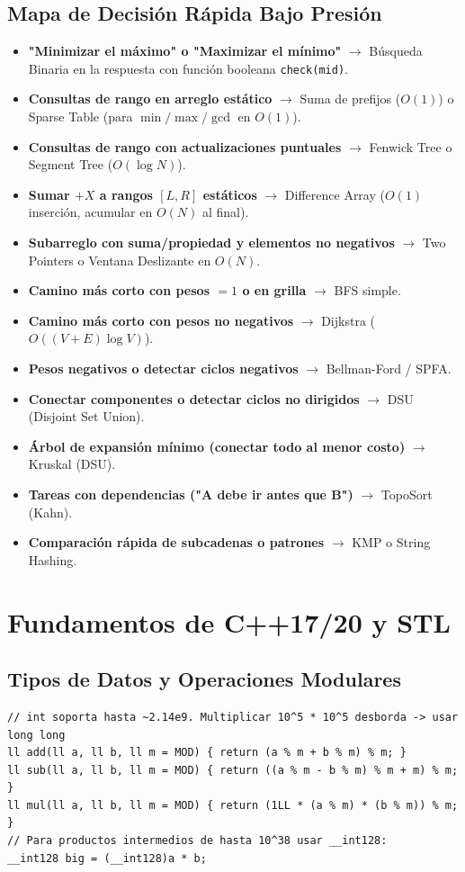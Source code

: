 \documentclass[9pt,twocolumn,a4paper]{extarticle}
\begin{document}
\subsection{Mapa de Decisión Rápida Bajo Presión}
\begin{itemize}
    \setlength{\itemsep}{0pt}
    \item \textbf{"Minimizar el máximo" o "Maximizar el mínimo"} $\to$ Búsqueda Binaria en la respuesta con función booleana \texttt{check(mid)}.
    \item \textbf{Consultas de rango en arreglo estático} $\to$ Suma de prefijos ($O(1)$) o Sparse Table (para $\min/\max/\gcd$ en $O(1)$).
    \item \textbf{Consultas de rango con actualizaciones puntuales} $\to$ Fenwick Tree o Segment Tree ($O(\log N)$).
    \item \textbf{Sumar $+X$ a rangos $[L, R]$ estáticos} $\to$ Difference Array ($O(1)$ inserción, acumular en $O(N)$ al final).
    \item \textbf{Subarreglo con suma/propiedad y elementos no negativos} $\to$ Two Pointers o Ventana Deslizante en $O(N)$.
    \item \textbf{Camino más corto con pesos $=1$ o en grilla} $\to$ BFS simple.
    \item \textbf{Camino más corto con pesos no negativos} $\to$ Dijkstra ($O((V+E)\log V)$).
    \item \textbf{Pesos negativos o detectar ciclos negativos} $\to$ Bellman-Ford / SPFA.
    \item \textbf{Conectar componentes o detectar ciclos no dirigidos} $\to$ DSU (Disjoint Set Union).
    \item \textbf{Árbol de expansión mínimo (conectar todo al menor costo)} $\to$ Kruskal (DSU).
    \item \textbf{Tareas con dependencias ("A debe ir antes que B")} $\to$ TopoSort (Kahn).
    \item \textbf{Comparación rápida de subcadenas o patrones} $\to$ KMP o String Hashing.
\end{itemize}

\section{Fundamentos de C++17/20 y STL}
\subsection{Tipos de Datos y Operaciones Modulares}
\begin{lstlisting}
// int soporta hasta ~2.14e9. Multiplicar 10^5 * 10^5 desborda -> usar long long
ll add(ll a, ll b, ll m = MOD) { return (a % m + b % m) % m; }
ll sub(ll a, ll b, ll m = MOD) { return ((a % m - b % m) % m + m) % m; }
ll mul(ll a, ll b, ll m = MOD) { return (1LL * (a % m) * (b % m)) % m; }
// Para productos intermedios de hasta 10^38 usar __int128:
__int128 big = (__int128)a * b;
\end{lstlisting}
\end{document}
